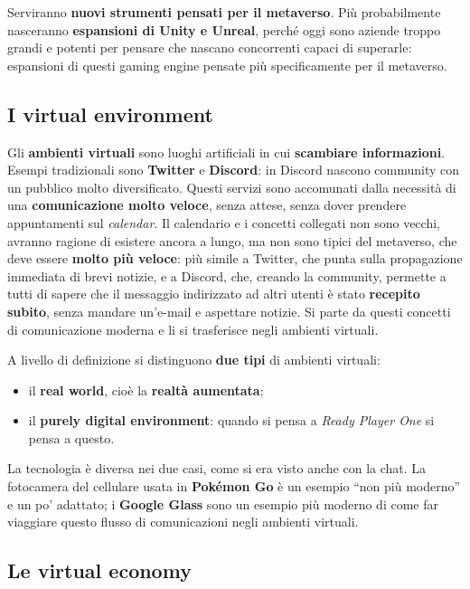 Serviranno \textbf{nuovi strumenti pensati per il metaverso}. Più probabilmente
nasceranno \textbf{espansioni di Unity e Unreal}, perché oggi sono aziende troppo
grandi e potenti per pensare che nascano concorrenti capaci di superarle:
espansioni di questi gaming engine pensate più specificamente per il metaverso.

\subsection{I virtual environment}

Gli \textbf{ambienti virtuali} sono luoghi artificiali in cui
\textbf{scambiare informazioni}. Esempi tradizionali sono \textbf{Twitter} e
\textbf{Discord}: in Discord nascono community con un pubblico molto
diversificato. Questi servizi sono accomunati dalla necessità di una
\textbf{comunicazione molto veloce}, senza attese, senza dover prendere
appuntamenti sul \emph{calendar}. Il calendario e i concetti collegati non sono
vecchi, avranno ragione di esistere ancora a lungo, ma non sono tipici del
metaverso, che deve essere \textbf{molto più veloce}: più simile a Twitter, che
punta sulla propagazione immediata di brevi notizie, e a Discord, che, creando la
community, permette a tutti di sapere che il messaggio indirizzato ad altri
utenti è stato \textbf{recepito subito}, senza mandare un'e-mail e aspettare
notizie. Si parte da questi concetti di comunicazione moderna e li si trasferisce
negli ambienti virtuali.

A livello di definizione si distinguono \textbf{due tipi} di ambienti virtuali:
\begin{itemize}
  \item il \textbf{real world}, cioè la \textbf{realtà aumentata};
  \item il \textbf{purely digital environment}: quando si pensa a \emph{Ready
        Player One} si pensa a questo.
\end{itemize}
La tecnologia è diversa nei due casi, come si era visto anche con la chat. La
fotocamera del cellulare usata in \textbf{Pokémon Go} è un esempio ``non più
moderno'' e un po' adattato; i \textbf{Google Glass} sono un esempio più moderno
di come far viaggiare questo flusso di comunicazioni negli ambienti virtuali.

\subsection{Le virtual economy}

